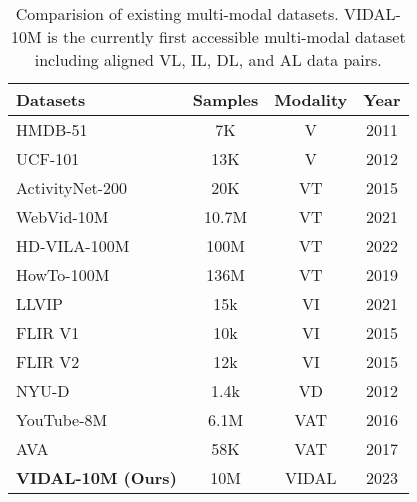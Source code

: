 \documentclass{article} \usepackage{iclr2024_conference,times}
\begin{document}
\begin{wraptable}{r}{0.45\textwidth}
\small
\vspace{-0.4cm}
\setlength\tabcolsep{0.8mm}
\caption{Comparision of existing multi-modal datasets. VIDAL-10M is the currently first accessible multi-modal dataset including aligned VL, IL, DL, and AL data pairs.}
\label{tab:dataset}
\centering
\begin{tabular}{l|ccc}
\toprule
\textbf{Datasets}  & \textbf{Samples}   & \textbf{Modality} & \textbf{Year} \\
\midrule
HMDB-51   & 7K & V & 2011\\
UCF-101  & 13K   & V & 2012\\
\midrule
ActivityNet-200 & 20K   & VT & 2015 \\
WebVid-10M & 10.7M  & VT & 2021\\
HD-VILA-100M  & 100M    & VT & 2022\\
HowTo-100M   & 136M   & VT & 2019\\
\midrule
LLVIP    & 15k   & VI &   2021 \\
FLIR V1   & 10k  & VI &   2015 \\
FLIR V2  & 12k   & VI &   2015 \\
NYU-D  & 1.4k   & VD &   2012 \\
YouTube-8M & 6.1M & VAT & 2016\\
AVA & 58K & VAT & 2017 \\

\midrule
\textbf{VIDAL-10M (Ours)} & 10M    & VIDAL & 2023\\
\bottomrule
\end{tabular}
\end{wraptable}
\end{document}

